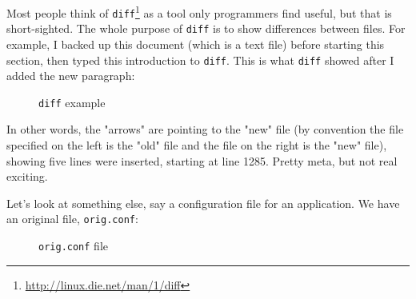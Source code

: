 \documentclass[10pt,american,]{book}
\makeatletter
\newenvironment{Shaded}{\begin{snugshade}}{\end{snugshade}}
\newcommand{\KeywordTok}[1]{\textcolor[rgb]{0.13,0.29,0.53}{\textbf{{#1}}}}
\newcommand{\OtherTok}[1]{\textcolor[rgb]{0.56,0.35,0.01}{{#1}}}
\newcommand{\NormalTok}[1]{{#1}}
\renewcommand{\href}[2]{#2\footnote{\url{#1}}}
\numberwithin{figure}{chapter}
\DeclareRobustCommand{\drcap}[1]{\begin{figure}[H]\caption{#1}\end{figure}}
\DeclareRobustCommand{\drcmd}[1]{\index{commands!#1@\texttt{#1}}}
\renewcommand{\KeywordTok}[1]{{#1}}
\renewcommand{\OtherTok}[1]{{#1}}
\renewcommand{\NormalTok}[1]{{#1}}
\makeatother
\begin{document}
Most people think of
\href{http://linux.die.net/man/1/diff}{\texttt{diff}}\drcmd{diff}
 as a
tool only programmers find useful, but that is short-sighted. The whole
purpose of \texttt{diff} is to show differences between files. For
example, I backed up this document (which is a text file) before
starting this section, then typed this introduction to \texttt{diff}.
This is what \texttt{diff} showed after I added the new paragraph:

\drcap{\texttt{diff} example}

\begin{Shaded}
\end{Shaded}

In other words, the "arrows" are pointing to the "new" file (by
convention the file specified on the left is the "old" file and the file
on the right is the "new" file), showing five lines were inserted,
starting at line 1285. Pretty meta, but not real exciting.

Let's look at something else, say a configuration file for an
application. We have an original file, \texttt{orig.conf}:

\drcap{\texttt{orig.conf} file}

\begin{Shaded}
\end{Shaded}
\end{document}
